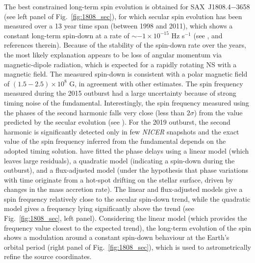 \documentclass[graybox]{svmult}
\def \saxj{{\rm SAX~J1808.4$-$3658\xspace}}
\def \nicer{{\em NICER\xspace}}
\begin{document}
The best constrained long-term spin evolution is obtained for \saxj{} (see left panel of Fig.~\ref{fig:1808_sec}), for which secular spin evolution has been measured over a 13 year time span (between 1998 and 2011), which shows a constant long-term spin-down at a rate of $\sim -1 \times 10^{-15}$ Hz s$^{-1}$ (see \cite{Patruno2012}, and references therein). Because of the stability of the spin-down rate over the years, the most likely explanation appears to be loss of angular momentum via magnetic-dipole radiation, which is expected for a rapidly rotating NS with a magnetic field. The measured spin-down is consistent with a polar magnetic field of $(1.5 - 2.5) \times 10^8$ G, in agreement with other estimates. The spin frequency measured during the 2015 outburst had a large uncertainty because of strong timing noise of the fundamental. Interestingly, the spin frequency measured using the phases of the second harmonic falls very close (less than $2 \sigma$) from the value predicted by the secular evolution (see \cite{Sanna2017c}). For the 2019 outburst, the second harmonic is significantly detected only in few \nicer{} snapshots and the exact value of the spin frequency inferred from the fundamental depends on the adopted timing solution. \cite{Bult2019c} have fitted the phase delays using a linear model (which leaves large residuals), a quadratic model (indicating a spin-down during the outburst), and a flux-adjusted model (under the hypothesis that phase variations with time originate from a hot-spot drifting on the stellar surface, driven by changes in the mass accretion rate). The linear and flux-adjusted models give a spin frequency relatively close to the secular spin-down trend, while the quadratic model gives a frequency lying significantly above the trend (see Fig.~\ref{fig:1808_sec}, left panel). Considering the linear model (which provides the frequency value closest to the expected trend), the long-term evolution of the spin shows a modulation around a constant spin-down behaviour at the Earth's orbital period (right panel of Fig.~\ref{fig:1808_sec}), which is used to astrometrically refine the source coordinates.
\end{document}
